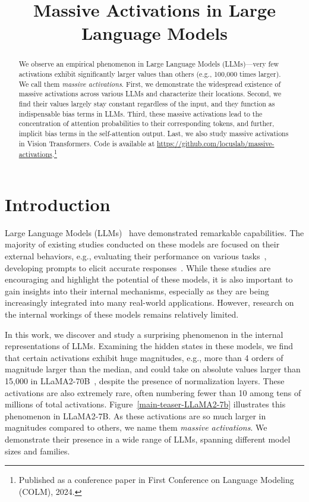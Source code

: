 \title{Massive Activations in Large Language Models}

\begin{abstract}
We observe an empirical phenomenon in Large Language Models (LLMs)---very few activations exhibit significantly larger values than others (e.g., 100,000 times larger). We call them \textit{massive activations}. First, we demonstrate the widespread existence of massive activations across various LLMs and characterize their locations. Second, we find their values largely stay constant regardless of the input, and they function as indispensable bias terms in LLMs. Third, these massive activations lead to the concentration of attention probabilities to their corresponding tokens, and further, implicit bias terms in the self-attention output. Last, we also study massive activations in Vision Transformers. Code is available at \url{https://github.com/locuslab/massive-activations}.\footnote{Published as a conference paper in First Conference on Language Modeling (COLM), 2024.}
\end{abstract}

\section{Introduction}

Large Language Models (LLMs)~\citep{brown2020gpt3, openai2023gpt4} have demonstrated remarkable capabilities. The majority of existing studies conducted on these models are focused on their external behaviors, e.g., evaluating their performance on various tasks~\citep{gpt_bar,bubeck2023sparks}, developing prompts to elicit accurate responses~\citep{wei2022cot,yang2023optimizer}.  While these studies are encouraging and highlight the potential of these models, it is also important to gain insights into their internal mechanisms, especially as they are being increasingly integrated into many real-world applications. However, research on the internal workings of these models remains relatively limited. 

In this work, we discover and study a surprising phenomenon in the internal representations of LLMs. Examining the hidden states in these models, we find that certain activations exhibit huge magnitudes, e.g., more than 4 orders of magnitude larger than the median, and could take on absolute values larger than 15,000 in LLaMA2-70B~\citep{touvron2023LLaMA2}, despite the presence of normalization layers. These activations are also extremely rare, often numbering fewer than 10 among tens of millions of total activations. Figure~\ref{main-teaser-LLaMA2-7b} illustrates this phenomenon in LLaMA2-7B. As these activations are so much larger in magnitudes compared to others, we name them \textit{massive activations}. We demonstrate their presence in a wide range of LLMs, spanning different model sizes and families. 

